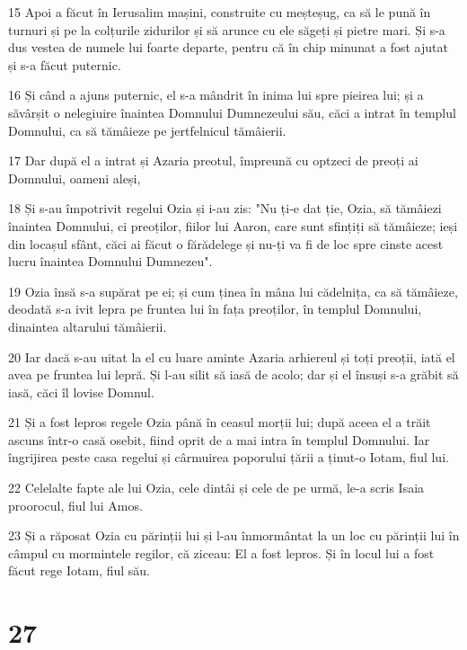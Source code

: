 \par 15 Apoi a făcut în Ierusalim mașini, construite cu meșteșug, ca să le pună în turnuri și pe la colțurile zidurilor și să arunce cu ele săgeți și pietre mari. Și s-a dus vestea de numele lui foarte departe, pentru că în chip minunat a fost ajutat și s-a făcut puternic.
\par 16 Și când a ajuns puternic, el s-a mândrit în inima lui spre pieirea lui; și a săvârșit o nelegiuire înaintea Domnului Dumnezeului său, căci a intrat în templul Domnului, ca să tămâieze pe jertfelnicul tămâierii.
\par 17 Dar după el a intrat și Azaria preotul, împreună cu optzeci de preoți ai Domnului, oameni aleși,
\par 18 Și s-au împotrivit regelui Ozia și i-au zis: "Nu ți-e dat ție, Ozia, să tămâiezi înaintea Domnului, ci preoților, fiilor lui Aaron, care sunt sfințiți să tămâieze; ieși din locașul sfânt, căci ai făcut o fărădelege și nu-ți va fi de loc spre cinste acest lucru înaintea Domnului Dumnezeu".
\par 19 Ozia însă s-a supărat pe ei; și cum ținea în mâna lui cădelnița, ca să tămâieze, deodată s-a ivit lepra pe fruntea lui în fața preoților, în templul Domnului, dinaintea altarului tămâierii.
\par 20 Iar dacă s-au uitat la el cu luare aminte Azaria arhiereul și toți preoții, iată el avea pe fruntea lui lepră. Și l-au silit să iasă de acolo; dar și el însuși s-a grăbit să iasă, căci îl lovise Domnul.
\par 21 Și a fost lepros regele Ozia până în ceasul morții lui; după aceea el a trăit ascuns într-o casă osebit, fiind oprit de a mai intra în templul Domnului. Iar îngrijirea peste casa regelui și cârmuirea poporului țării a ținut-o Iotam, fiul lui.
\par 22 Celelalte fapte ale lui Ozia, cele dintâi și cele de pe urmă, le-a scris Isaia proorocul, fiul lui Amos.
\par 23 Și a răposat Ozia cu părinții lui și l-au înmormântat la un loc cu părinții lui în câmpul cu mormintele regilor, că ziceau: El a fost lepros. Și în locul lui a fost făcut rege Iotam, fiul său.

\chapter{27}

